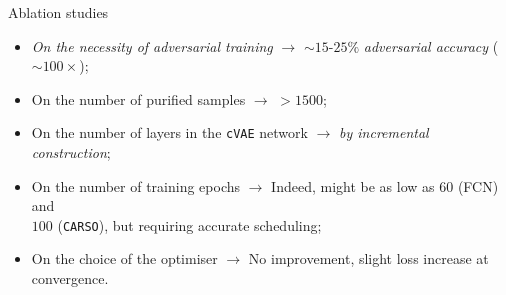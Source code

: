 {\begin{frame}{ Ablation studies}
    \begin{itemize}
        \item \textit{On the necessity of adversarial training} $\rightarrow$ $\sim 15$-$25\%$ \textit{adversarial accuracy} \alert{($\sim100\times$)};
        \item On the number of purified samples $\rightarrow$ $>1500$;
        \item On the number of layers in the \texttt{cVAE} network $\rightarrow$ \textit{by incremental construction};
        \item On the number of training epochs $\rightarrow$ Indeed, might be as low as $60$ (FCN) and\\\hphantom{On the number of training epochs $\rightarrow$ }$100$ (\texttt{CARSO}), but requiring \alert{accurate scheduling};
        \item On the choice of the optimiser $\rightarrow$ No improvement, slight loss increase at\\\hphantom{On the choice of the optimiser $\rightarrow$} convergence.
    \end{itemize}
    \end{frame}
}